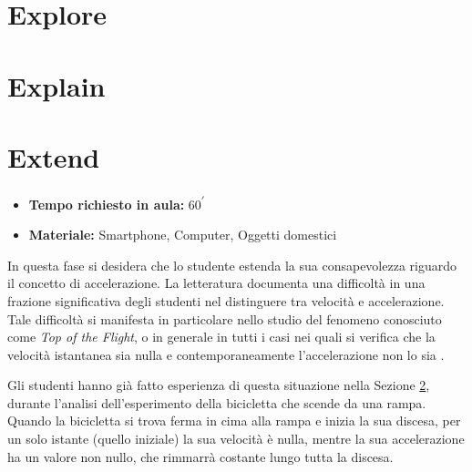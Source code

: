 \documentclass{report} \usepackage[T1]{fontenc} \usepackage[italian]{babel}
\begin{document}
\section{Explore}

\section{Explain}\label{a_explain}

\section{Extend}
\begin{itemize}
\item \textbf{Tempo richiesto in aula:} 60\textsuperscript{$\prime$}
\item \textbf{Materiale:} Smartphone, Computer, Oggetti domestici
\end{itemize}

In questa fase si desidera che lo studente estenda la sua consapevolezza
riguardo il concetto di accelerazione. La letteratura documenta una difficoltà
in una frazione significativa degli studenti nel distinguere tra velocità
e accelerazione. Tale difficoltà si manifesta in particolare nello studio
del fenomeno conosciuto come \emph{Top of the Flight}, o in generale
in tutti i casi nei quali si verifica che la velocità istantanea sia nulla
e contemporaneamente l'accelerazione non lo sia\cite{arons1997teaching}
\cite{trowbridge1981investigation}.

Gli studenti hanno già fatto esperienza di questa situazione nella Sezione
\ref{a_explain}, durante l'analisi dell'esperimento della bicicletta che
scende da una rampa. Quando la bicicletta si trova ferma in cima alla rampa
e inizia la sua discesa, per un solo istante (quello iniziale) la sua velocità
è nulla, mentre la sua accelerazione ha un valore non nullo, che rimmarrà costante
lungo tutta la discesa.
\end{document}
